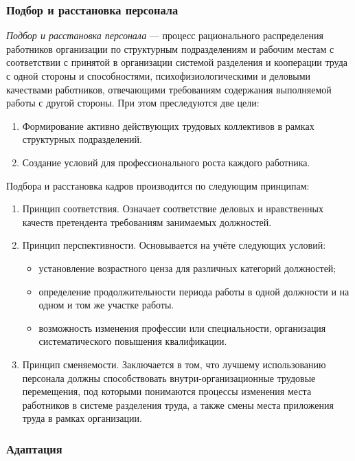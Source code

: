 \documentclass[12pt, russian, oneside, article]{ncc}
\begin{document}
\subsubsection{Подбор и расстановка персонала}
\label{sec-4_2_2}


\emph{Подбор и расстановка персонала} --- процесс рационального распределения работников организации по структурным подразделениям и рабочим местам с соответствии с принятой в организации системой разделения и кооперации труда с одной стороны и способностями, психофизиологическими и деловыми качествами работников, отвечающими требованиям содержания выполняемой работы с другой стороны. При этом преследуются две цели:
\begin{enumerate}
\item Формирование активно действующих трудовых коллективов в рамках структурных подразделений.
\item Создание условий для профессионального роста каждого работника.
\end{enumerate}

Подбора и расстановка кадров производится по следующим принципам:
\begin{enumerate}
\item Принцип соответствия. Означает соответствие деловых и нравственных качеств претендента требованиям занимаемых должностей.
\item Принцип перспективности. Основывается на учёте следующих условий:

\begin{itemize}
\item установление возрастного ценза для различных категорий должностей;
\item определение продолжительности периода работы в одной должности и на одном и том же участке работы.
\item возможность изменения профессии или специальности, организация систематического повышения квалификации.
\end{itemize}

\item Принцип сменяемости. Заключается в том, что лучшему использованию персонала должны способствовать внутри-организационные трудовые перемещения, под которыми понимаются процессы изменения места работников в системе разделения труда, а также смены места приложения труда в рамках организации.
\end{enumerate}
\subsubsection{Адаптация}
\label{sec-4_2_3}
\end{document}
